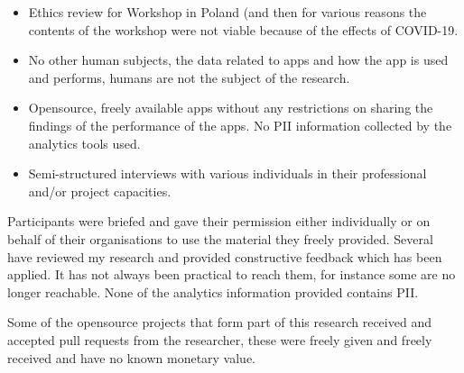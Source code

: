 \begin{itemize}
    \item Ethics review for Workshop in Poland (and then for various reasons the contents of the workshop were not viable because of the effects of COVID-19.
    \item No other human subjects, the data related to apps and how the app is used and performs, humans are not the subject of the research.
    \item Opensource, freely available apps without any restrictions on sharing the findings of the performance of the apps. No PII information collected by the analytics tools used.
    \item Semi-structured interviews with various individuals in their professional and/or project capacities.
\end{itemize}

Participants were briefed and gave their permission either individually or on behalf of their organisations to use the material they freely provided. Several have reviewed my research and provided constructive feedback which has been applied. 
It has not always been practical to reach them, for instance some are no longer reachable. None of the analytics information provided contains PII.

Some of the opensource projects that form part of this research received and accepted pull requests from the researcher, these were freely given and freely received and have no known monetary value.

\clearpage